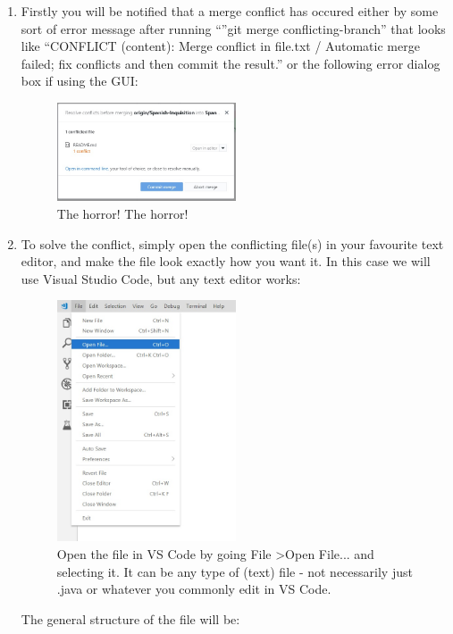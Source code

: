 \documentclass[11pt, titlepage]{article}
\begin{document}
\begin{enumerate}
	\item Firstly you will be notified that a merge conflict has occured either by some sort of error message after running ``''git merge conflicting-branch'' that looks like ``CONFLICT (content): Merge conflict in file.txt / Automatic merge failed; fix conflicts and then commit the result.'' or the following error dialog box if using the GUI:
	\begin{figure}[H]
		\centering
		\includegraphics[width=0.5\textwidth]{SMC/1conflict-dialog}
		\caption{The horror! The horror!}
	\end{figure}
	\item To solve the conflict, simply open the conflicting file(s) in your favourite text editor, and make the file look exactly how you want it. In this case we will use Visual Studio Code, but any text editor works:
	\begin{figure}[H]
		\centering
		\includegraphics[width=0.5\textwidth]{SMC/2open-file}
		\caption{Open the file in VS Code by going File \textgreater Open File... and selecting it. It can be any type of (text) file - not necessarily just .java or whatever you commonly edit in VS Code.}
	\end{figure}
	The general structure of the file will be:
	\begin{table}[H]

\end{table}
\end{enumerate}
\end{document}
